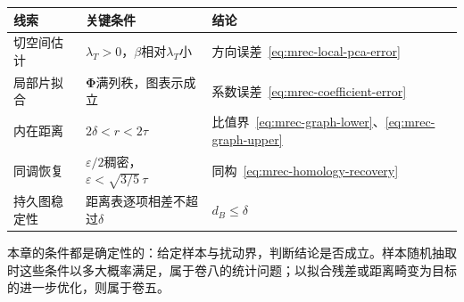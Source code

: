 \begin{BookInlineTable}
  \centering
  \caption{本章各线索的条件与结论}
  \label{tab:mrec-summary}
  \begin{tabular}{lll}
    \toprule
    线索 & 关键条件 & 结论 \\
    \midrule
    切空间估计 & $\lambda_T>0$，$\beta$相对$\lambda_T$小 & 方向误差~\eqref{eq:mrec-local-pca-error} \\
    局部片拟合 & $\bm\Phi$满列秩，图表示成立 & 系数误差~\eqref{eq:mrec-coefficient-error} \\
    内在距离 & $2\delta<r<2\tau$ & 比值界~\eqref{eq:mrec-graph-lower}、\eqref{eq:mrec-graph-upper} \\
    同调恢复 & $\varepsilon/2$稠密，$\varepsilon<\sqrt{3/5}\,\tau$ & 同构~\eqref{eq:mrec-homology-recovery} \\
    持久图稳定性 & 距离表逐项相差不超过$\delta$ & $d_B\leq\delta$ \\
    \bottomrule
  \end{tabular}
\end{BookInlineTable}

本章的条件都是确定性的：给定样本与扰动界，判断结论是否成立。样本随机抽取时这些条件以多大概率满足，属于卷八的统计问题；以拟合残差或距离畸变为目标的进一步优化，则属于卷五。
